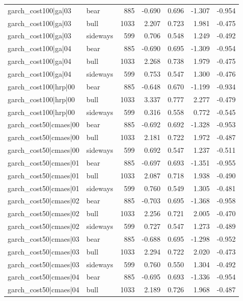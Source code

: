 \begin{table}
\begin{tabular}{llrrrrr}
garch\_cost100|ga|03 & bear & 885 & -0.690 & 0.696 & -1.307 & -0.954 \\
garch\_cost100|ga|03 & bull & 1033 & 2.207 & 0.723 & 1.981 & -0.475 \\
garch\_cost100|ga|03 & sideways & 599 & 0.706 & 0.548 & 1.249 & -0.492 \\
garch\_cost100|ga|04 & bear & 885 & -0.690 & 0.695 & -1.309 & -0.954 \\
garch\_cost100|ga|04 & bull & 1033 & 2.268 & 0.738 & 1.979 & -0.475 \\
garch\_cost100|ga|04 & sideways & 599 & 0.753 & 0.547 & 1.300 & -0.476 \\
garch\_cost100|hrp|00 & bear & 885 & -0.648 & 0.670 & -1.199 & -0.934 \\
garch\_cost100|hrp|00 & bull & 1033 & 3.337 & 0.777 & 2.277 & -0.479 \\
garch\_cost100|hrp|00 & sideways & 599 & 0.316 & 0.558 & 0.772 & -0.545 \\
garch\_cost50|cmaes|00 & bear & 885 & -0.692 & 0.692 & -1.328 & -0.953 \\
garch\_cost50|cmaes|00 & bull & 1033 & 2.181 & 0.722 & 1.972 & -0.487 \\
garch\_cost50|cmaes|00 & sideways & 599 & 0.692 & 0.547 & 1.237 & -0.511 \\
garch\_cost50|cmaes|01 & bear & 885 & -0.697 & 0.693 & -1.351 & -0.955 \\
garch\_cost50|cmaes|01 & bull & 1033 & 2.087 & 0.718 & 1.938 & -0.490 \\
garch\_cost50|cmaes|01 & sideways & 599 & 0.760 & 0.549 & 1.305 & -0.481 \\
garch\_cost50|cmaes|02 & bear & 885 & -0.703 & 0.695 & -1.368 & -0.958 \\
garch\_cost50|cmaes|02 & bull & 1033 & 2.256 & 0.721 & 2.005 & -0.470 \\
garch\_cost50|cmaes|02 & sideways & 599 & 0.727 & 0.547 & 1.273 & -0.489 \\
garch\_cost50|cmaes|03 & bear & 885 & -0.688 & 0.695 & -1.298 & -0.952 \\
garch\_cost50|cmaes|03 & bull & 1033 & 2.294 & 0.722 & 2.020 & -0.473 \\
garch\_cost50|cmaes|03 & sideways & 599 & 0.760 & 0.550 & 1.304 & -0.492 \\
garch\_cost50|cmaes|04 & bear & 885 & -0.695 & 0.693 & -1.336 & -0.954 \\
garch\_cost50|cmaes|04 & bull & 1033 & 2.189 & 0.726 & 1.968 & -0.487 \\

\end{tabular}
\end{table}
